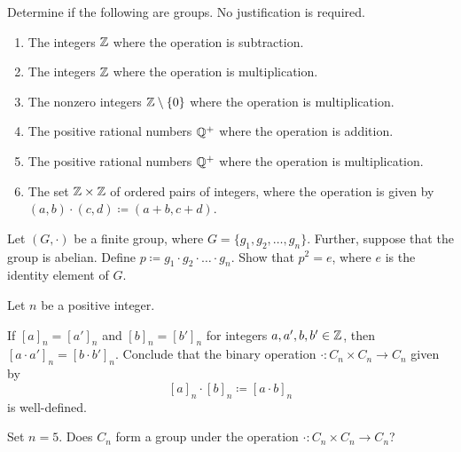 \documentclass[../notes.tex]{subfiles}
\begin{document}
\begin{homework}
    Determine if the following are groups. No justification is required.
    \begin{enumerate}[label=(\alph*)]
        \item The integers $\mathbb Z$ where the operation is subtraction.
        \item The integers $\mathbb Z$ where the operation is multiplication.
        \item The nonzero integers $\mathbb Z\setminus\{0\}$ where the operation is multiplication.
        \item The positive rational numbers $\mathbb Q^+$ where the operation is addition.
        \item The positive rational numbers $\mathbb Q^+$ where the operation is multiplication.
        \item The set $\mathbb Z\times\mathbb Z$ of ordered pairs of integers, where the operation is given by $(a,b)\cdot(c,d)\coloneqq(a+b,c+d)$.
    \end{enumerate}
\end{homework}

\begin{homework}
    Let $(G,\cdot)$ be a finite group, where $G=\{g_1,g_2,\ldots,g_n\}$. Further, suppose that the group is abelian. Define $p\coloneqq g_1\cdot g_2\cdot\ldots\cdot g_n$. Show that $p^2=e$, where $e$ is the identity element of $G$.
\end{homework}


\begin{homework}
    Let $n$ be a positive integer.
    \begin{listalph}
        \item If $[a]_n=[a']_n$ and $[b]_n=[b']_n$ for integers $a,a',b,b'\in\mathbb Z$, then $[a\cdot a']_n=[b\cdot b']_n$. Conclude that the binary operation $\cdot\colon C_n\times C_n\to C_n$ given by
        \[[a]_n\cdot [b]_n\coloneqq[a\cdot b]_n\]
        is well-defined.
        \item Set $n=5$. Does $C_n$ form a group under the operation $\cdot\colon C_n\times C_n\to C_n$?
    \end{listalph}
\end{homework}
\end{document}
